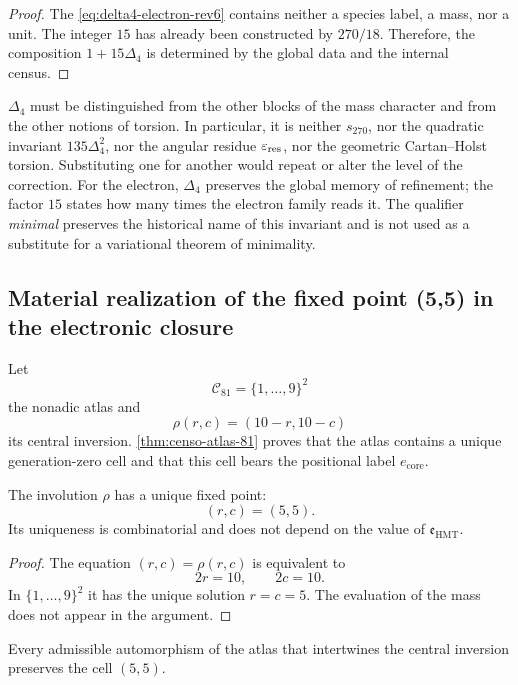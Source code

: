 \begin{proof}
The \cref{eq:delta4-electron-rev6} contains neither a species label, a
mass, nor a unit. The integer \(15\) has already been constructed by \(270/18\).
Therefore, the composition \(1+15\Delta_4\) is determined by the
global data and the internal census.
\end{proof}

\(\Delta_4\) must be distinguished from the other blocks of the mass character and from the other notions of torsion. In particular, it is neither \(s_{270}\), nor the quadratic invariant \(135\Delta_4^2\), nor the angular residue \(\varepsilon_{\rm res}\), nor the geometric Cartan--Holst torsion. Substituting one for another would repeat or alter the level of the correction. For the electron, \(\Delta_4\) preserves the global memory of refinement; the factor \(15\) states how many times the electron family reads it. The qualifier \emph{minimal} preserves the historical name of this invariant and is not used as a substitute for a variational theorem of minimality.

\subsection{Material realization of the fixed point (5,5) in the electronic closure}

Let
\[
 \mathcal C_{81}=\{1,\ldots,9\}^2
\]
the nonadic atlas and
\[
 \rho(r,c)=(10-r,10-c)
\]
its central inversion. \cref{thm:censo-atlas-81} proves that the atlas
contains a unique generation-zero cell and that this cell bears the positional
label \(e_{\mathrm{core}}\).

\begin{proposition}
\label{prop:centro-electron-rev6}
The involution \(\rho\) has a unique fixed point:
\[
 \boxed{(r,c)=(5,5).}
\]
Its uniqueness is combinatorial and does not depend on the value of
\(\mathfrak e_{\mathrm{HMT}}\).
\end{proposition}

\begin{proof}
The equation \((r,c)=\rho(r,c)\) is equivalent to
\[
 2r=10,\qquad2c=10.
\]
In \(\{1,\ldots,9\}^2\) it has the unique solution \(r=c=5\). The evaluation
of the mass does not appear in the argument.
\end{proof}

\begin{corollary}
\label{cor:universalidad-electron-central-rev6}
Every admissible automorphism of the atlas that intertwines the central inversion
preserves the cell \((5,5)\).
\end{corollary}

